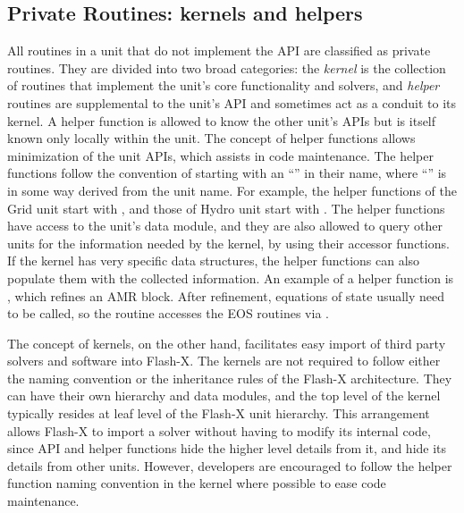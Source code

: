 \subsection{Private Routines:  kernels and helpers}
\label{Sec:privateRoutines}
All routines in a unit that do not implement the API are classified as
private routines. They are divided into two broad categories: the
\emph{kernel}%
is the collection of routines that implement the unit's
core functionality and solvers, and \emph{helper} routines are
supplemental to the unit's API and sometimes act as a conduit
to its kernel. A helper function is allowed to know the other unit's
APIs but is itself known only locally within the unit. The concept of
helper functions allows minimization of the unit APIs, which assists in
code maintenance. The helper functions follow the
convention of starting with an  ``'' in their name, where ``'' is
in some way derived from the unit name. For example, the helper
functions of the \unit{Grid} unit start with , and those
of \unit{Hydro} unit start with . The helper functions
have access to the unit's data module, and they are also allowed to
query other units for the information needed by the kernel, 
by using their accessor functions. If the
kernel has very specific data structures, the helper functions can
also populate them with the collected information. An example of 
a helper function is , which refines an AMR block.
After refinement, equations of state usually need to be called, so the routine
accesses the EOS routines via .

The concept of
kernels, on the other hand, facilitates easy import of third party
solvers and software into  Flash-X. The kernels are not required to
follow either the naming convention or the inheritance rules of the
Flash-X architecture. They can have their own hierarchy and data
modules, and the top level of the kernel typically resides at leaf
level of the Flash-X unit hierarchy. This arrangement allows Flash-X to
import a solver without having to modify its internal code, since
API and helper functions hide the higher level details from it, and
hide its details from other units. However, developers
are encouraged to follow the helper function naming convention in the
kernel where possible to ease code maintenance. 

